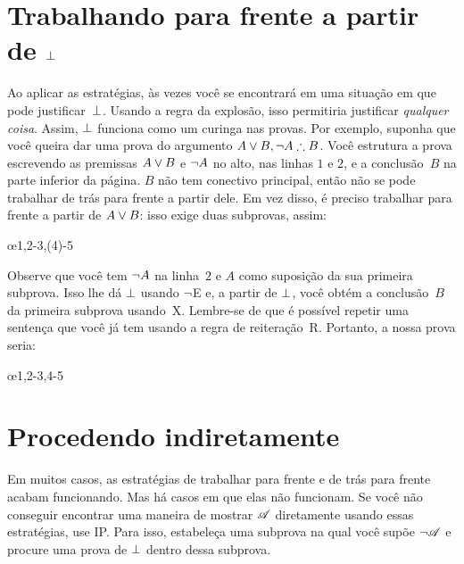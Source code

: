\section{Trabalhando para frente a partir de $\bot$}\label{sec:backred}

Ao aplicar as estratégias, às vezes você se encontrará em uma situação em que pode justificar~$\bot$. Usando a regra da explosão, isso permitiria justificar \emph{qualquer coisa}. Assim, $\bot$ funciona como um curinga nas provas. Por exemplo, suponha que você queira dar uma prova do argumento $A \eor B, \enot A \therefore B$. Você estrutura a prova escrevendo as premissas $A \vee B$ e $\neg A$ no alto, nas linhas $1$ e $2$, e a conclusão~$B$ na parte inferior da página. $B$ não tem conectivo principal, então não se pode trabalhar de trás para frente a partir dele. Em vez disso, é preciso trabalhar para frente a partir de $A \vee B$: isso exige duas subprovas, assim:
\begin{fitchproof}
	\PR
	\PR
	\open
	 \AS
	\ellipsesline 
	\close 
	\open
	\AS
	\ellipsesline
	\close
	\oe{1,2-3,(4)-5} 
\end{fitchproof} 
Observe que você tem $\neg A$ na linha~$2$ e $A$ como suposição da sua primeira subprova. Isso lhe dá $\bot$ usando $\neg$E e, a partir de $\bot$, você obtém a conclusão~$B$ da primeira subprova usando~X. Lembre-se de que é possível repetir uma sentença que você já tem usando a regra de reiteração~R. Portanto, a nossa prova seria:
\begin{fitchproof}
	\PR
	\PR
	\open
	 \AS
	\close 
	\open
	\AS
	\close
	\oe{1,2-3,4-5} 
\end{fitchproof} 

\section{Procedendo indiretamente}

Em muitos casos, as estratégias de trabalhar para frente e de trás para frente acabam funcionando. Mas há casos em que elas não funcionam. Se você não conseguir encontrar uma maneira de mostrar $\mathscr{A}$ diretamente usando essas estratégias, use IP. Para isso, estabeleça uma subprova na qual você supõe $\neg\mathscr{A}$ e procure uma prova de $\bot$ dentro dessa subprova.

